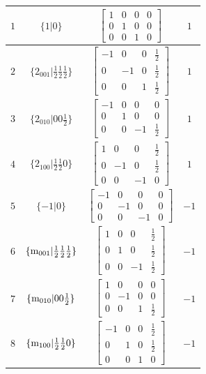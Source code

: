 \documentclass[fleqn,8pt]{jsarticle}
\begin{document}
\begin{longtable}{cccc}
$ 1 $ & $ \{1|0\} $ & $ \begin{bmatrix} 1 & 0 & 0 & 0 \\ 0 & 1 & 0 & 0 \\ 0 & 0 & 1 & 0 \end{bmatrix} $ & $ 1 $ \\ \hline
$ 2 $ & $ \{2{}_{001}|\frac{1}{2} \frac{1}{2} \frac{1}{2}\} $ & $ \begin{bmatrix} -1 & 0 & 0 & \frac{1}{2} \\ 0 & -1 & 0 & \frac{1}{2} \\ 0 & 0 & 1 & \frac{1}{2} \end{bmatrix} $ & $ 1 $ \\ \hline
$ 3 $ & $ \{2{}_{010}|0 0 \frac{1}{2}\} $ & $ \begin{bmatrix} -1 & 0 & 0 & 0 \\ 0 & 1 & 0 & 0 \\ 0 & 0 & -1 & \frac{1}{2} \end{bmatrix} $ & $ 1 $ \\ \hline
$ 4 $ & $ \{2{}_{100}|\frac{1}{2} \frac{1}{2} 0\} $ & $ \begin{bmatrix} 1 & 0 & 0 & \frac{1}{2} \\ 0 & -1 & 0 & \frac{1}{2} \\ 0 & 0 & -1 & 0 \end{bmatrix} $ & $ 1 $ \\ \hline
$ 5 $ & $ \{-1|0\} $ & $ \begin{bmatrix} -1 & 0 & 0 & 0 \\ 0 & -1 & 0 & 0 \\ 0 & 0 & -1 & 0 \end{bmatrix} $ & $ -1 $ \\ \hline
$ 6 $ & $ \{{\rm m}_{001}|\frac{1}{2} \frac{1}{2} \frac{1}{2}\} $ & $ \begin{bmatrix} 1 & 0 & 0 & \frac{1}{2} \\ 0 & 1 & 0 & \frac{1}{2} \\ 0 & 0 & -1 & \frac{1}{2} \end{bmatrix} $ & $ -1 $ \\ \hline
$ 7 $ & $ \{{\rm m}_{010}|0 0 \frac{1}{2}\} $ & $ \begin{bmatrix} 1 & 0 & 0 & 0 \\ 0 & -1 & 0 & 0 \\ 0 & 0 & 1 & \frac{1}{2} \end{bmatrix} $ & $ -1 $ \\ \hline
$ 8 $ & $ \{{\rm m}_{100}|\frac{1}{2} \frac{1}{2} 0\} $ & $ \begin{bmatrix} -1 & 0 & 0 & \frac{1}{2} \\ 0 & 1 & 0 & \frac{1}{2} \\ 0 & 0 & 1 & 0 \end{bmatrix} $ & $ -1 $ \\
\end{longtable}
\end{document}
